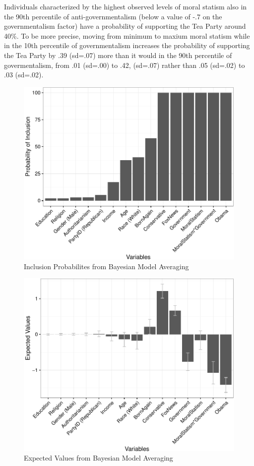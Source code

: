 \documentclass[12pt,]{article}
\begin{document}
Individuals characterized by the highest observed levels of moral
statism also in the 90th percentile of anti-governmentalism (below a
value of -.7 on the governmentalism factor) have a probability of
supporting the Tea Party around 40\%. To be more precise, moving from
minimum to maxium moral statism while in the 10th percentile of
governmentalism increases the probability of supporting the Tea Party by
.39 (sd=.07) more than it would in the 90th percentile of
govermentalism, from .01 (sd=.00) to .42, (sd=.07) rather than .05
(sd=.02) to .03 (sd=.02).

\clearpage

\begin{figure}[htbp]
\centering
\includegraphics{figures/bma2-1.pdf}
\caption{Inclusion Probabilites from Bayesian Model Averaging}
\end{figure}

\clearpage

\begin{figure}[htbp]
\centering
\includegraphics{figures/bma3-1.pdf}
\caption{Expected Values from Bayesian Model Averaging}
\end{figure}
\end{document}
